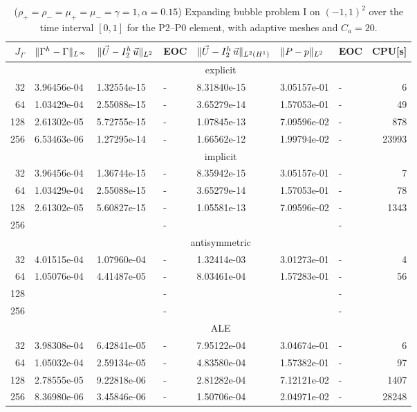 \begin{table}
\center
\hspace*{-3.25cm}
\begin{tabular}{rllllllr}
\hline
$J_\Gamma$ & $\|\Gamma^h - \Gamma\|_{L^\infty}$ & $\|\vec U - I^h_{2}\,\vec u\|_{L^2}$ & EOC & $\|\vec U - I^h_{2}\,\vec u\|_{L^2(H^1)}$ & $\|P - p\|_{L^2}$ & EOC
& CPU[s] \\
\hline
& \multicolumn{7}{c}{explicit} \\
\hline
 32 & 3.96456e-04 & 1.32554e-15 & - & 8.31840e-15 & 3.05157e-01 & - &     6 \\
 64 & 1.03429e-04 & 2.55088e-15 & - & 3.65279e-14 & 1.57053e-01 & - &    49 \\
128 & 2.61302e-05 & 5.72755e-15 & - & 1.07845e-13 & 7.09596e-02 & - &   878 \\
256 & 6.53463e-06 & 1.27295e-14 & - & 1.66562e-12 & 1.99794e-02 & - & 23993 \\
\hline
& \multicolumn{7}{c}{implicit} \\
\hline
 32 & 3.96456e-04 & 1.36744e-15 & - & 8.35942e-15 & 3.05157e-01 & - &    7 \\
 64 & 1.03429e-04 & 2.55088e-15 & - & 3.65279e-14 & 1.57053e-01 & - &   78 \\
128 & 2.61302e-05 & 5.60827e-15 & - & 1.05581e-13 & 7.09596e-02 & - & 1343 \\
256 & & & - & & & - & \\
\hline
& \multicolumn{7}{c}{antisymmetric} \\
\hline
 32 & 4.01515e-04 & 1.07960e-04 & - & 1.32414e-03 & 3.01273e-01 & - &  4 \\
 64 & 1.05076e-04 & 4.41487e-05 & - & 8.03461e-04 & 1.57283e-01 & - & 56 \\
128 & & & - & & & - & \\
256 & & & - & & & - & \\
\hline
& \multicolumn{7}{c}{ALE} \\
\hline
 32 & 3.98308e-04 & 6.42841e-05 & - & 7.95122e-04 & 3.04674e-01 & - &     6 \\
 64 & 1.05032e-04 & 2.59134e-05 & - & 4.83580e-04 & 1.57382e-01 & - &    97 \\
128 & 2.78555e-05 & 9.22818e-06 & - & 2.81282e-04 & 7.12121e-02 & - &  1407 \\
256 & 8.36980e-06 & 3.45846e-06 & - & 1.50706e-04 & 2.04971e-02 & - & 28248 \\
\hline
\end{tabular}
\hspace*{-3.25cm}
\caption[Navier--Stokes expanding bubble I errors P2--P0]
{($\rho_+ = \rho_- = \mu_+ = \mu_- = \gamma = 1,\alpha=0.15$)
Expanding bubble problem I on $(-1,1)^2$ over the time interval $[0,1]$ for the
P2--P0 element, with adaptive meshes and $C_a=20$\textdegree.}
\label{tab:nsexpandingbubbleIp2p0}
\end{table}

